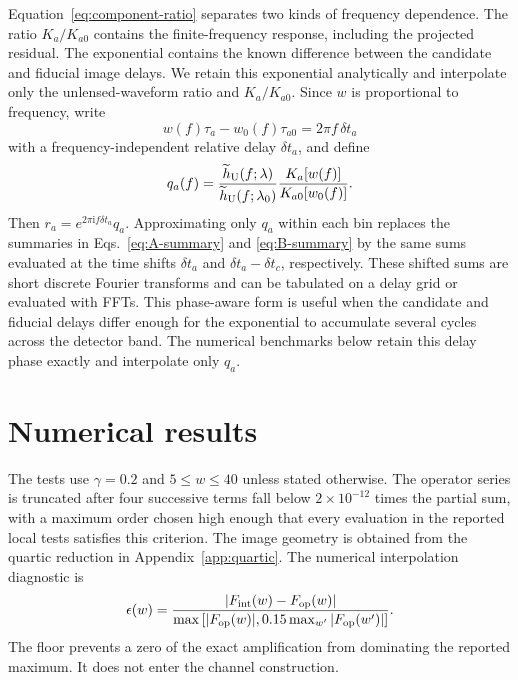 \documentclass[aps,prd,twocolumn,nofootinbib,superscriptaddress,floatfix]{revtex4-2}
\newcommand{\ii}{\mathrm{i}}
\begin{document}
Equation~\eqref{eq:component-ratio} separates two kinds of frequency
dependence.  The ratio $K_a/K_{a0}$ contains the finite-frequency response,
including the projected residual.  The exponential contains the known
difference between the candidate and fiducial image delays.  We retain this
exponential analytically and interpolate only the unlensed-waveform ratio and
$K_a/K_{a0}$.  Since $w$ is proportional to frequency, write
\begin{equation}
 w(f)\tau_a-w_0(f)\tau_{a0}=2\pi f\,\delta t_a
 \label{eq:channel-time-shift}
\end{equation}
with a frequency-independent relative delay $\delta t_a$, and define
\begin{equation}
 q_a(f)=
 \frac{\widetilde h_{\rm U}(f;\lambda)}
      {\widetilde h_{\rm U}(f;\lambda_0)}
 \frac{K_a[w(f)]}{K_{a0}[w_0(f)]}.
 \label{eq:slow-component-ratio}
\end{equation}
Then $r_a=e^{2\pi\ii f\delta t_a}q_a$.  Approximating only $q_a$ within each
bin replaces the summaries in Eqs.~\eqref{eq:A-summary} and
\eqref{eq:B-summary} by the same sums evaluated at the time shifts
$\delta t_a$ and $\delta t_a-\delta t_c$, respectively.  These shifted sums
are short discrete Fourier transforms and can be tabulated on a delay grid or
evaluated with FFTs.  This phase-aware form is useful when the candidate and
fiducial delays differ enough for the exponential to accumulate several cycles
across the detector band.  The numerical benchmarks below retain this delay phase exactly and
interpolate only $q_a$.

\section{Numerical results}
\label{sec:numerics}

The tests use $\gamma=0.2$ and $5\leq w\leq40$ unless stated otherwise.  The
operator series is truncated after four successive terms fall below
$2\times10^{-12}$ times the partial sum, with a maximum order chosen high
enough that every evaluation in the reported local tests satisfies this
criterion.  The image geometry is obtained from the quartic reduction in
Appendix~\ref{app:quartic}.  The numerical interpolation diagnostic is
\begin{equation}
 \epsilon(w)=\frac{|F_{\rm int}(w)-F_{\rm op}(w)|}
 {\max\left[|F_{\rm op}(w)|,
 0.15\max_{w'}|F_{\rm op}(w')|\right]}.
 \label{eq:error-profile}
\end{equation}
The floor prevents a zero of the exact amplification from dominating the
reported maximum.  It does not enter the channel construction.
\end{document}
